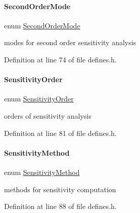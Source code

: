 \paragraph{\texorpdfstring{Second\+Order\+Mode}{SecondOrderMode}}
{\footnotesize\ttfamily enum \mbox{\hyperlink{namespaceamici_a2d77779286167d5603a870bf9f6c21ba}{Second\+Order\+Mode}}\hspace{0.3cm}{\ttfamily [strong]}}

modes for second order sensitivity analysis 

Definition at line 74 of file defines.\+h.

\mbox{\label{namespaceamici_aaa03ec2f8c4d5323b98d71134a462fda}} 
\paragraph{\texorpdfstring{Sensitivity\+Order}{SensitivityOrder}}
{\footnotesize\ttfamily enum \mbox{\hyperlink{namespaceamici_aaa03ec2f8c4d5323b98d71134a462fda}{Sensitivity\+Order}}\hspace{0.3cm}{\ttfamily [strong]}}

orders of sensitivity analysis 

Definition at line 81 of file defines.\+h.

\mbox{\label{namespaceamici_aa0fa493529f6872e7e776b91fbbf38f9}} 
\paragraph{\texorpdfstring{Sensitivity\+Method}{SensitivityMethod}}
{\footnotesize\ttfamily enum \mbox{\hyperlink{namespaceamici_aa0fa493529f6872e7e776b91fbbf38f9}{Sensitivity\+Method}}\hspace{0.3cm}{\ttfamily [strong]}}

methods for sensitivity computation 

Definition at line 88 of file defines.\+h.

\mbox{\label{namespaceamici_a1a6a4776314a0843143e5631c3ce21a7}} 
